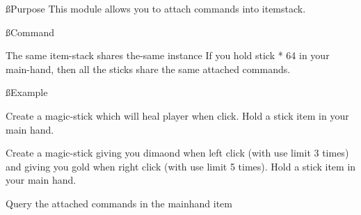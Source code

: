 
\ss{Purpose}
This module allows you to attach commands into itemstack.

\ss{Command}

\begin{note}{The same item-stack shares the-same instance}
    If you hold stick * 64 in your main-hand, then all the sticks share the same attached commands.
\end{note}

\ss{Example}
\begin{example}{Create a magic-stick which will heal player when click.}
    Hold a stick item in your main hand.\\
\end{example}

\begin{example}{Create a magic-stick giving you dimaond when left click (with use limit 3 times) and giving you gold when right click (with use limit 5 times).}
    Hold a stick item in your main hand.


\end{example}

\begin{example}{Query the attached commands in the mainhand item}
\end{example}
